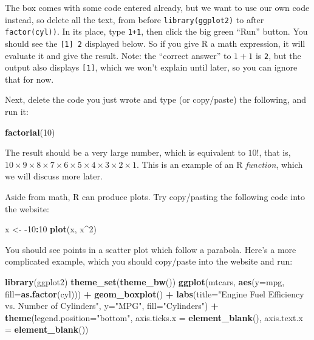 \documentclass[
]{article}
\newenvironment{Shaded}{\begin{snugshade}}{\end{snugshade}}
\newcommand{\DataTypeTok}[1]{\textcolor[rgb]{0.13,0.29,0.53}{#1}}
\newcommand{\DecValTok}[1]{\textcolor[rgb]{0.00,0.00,0.81}{#1}}
\newcommand{\KeywordTok}[1]{\textcolor[rgb]{0.13,0.29,0.53}{\textbf{#1}}}
\newcommand{\NormalTok}[1]{#1}
\newcommand{\OperatorTok}[1]{\textcolor[rgb]{0.81,0.36,0.00}{\textbf{#1}}}
\newcommand{\StringTok}[1]{\textcolor[rgb]{0.31,0.60,0.02}{#1}}
\begin{document}
The box comes with some code entered already, but we want to use our own code instead, so delete all the text, from before \texttt{library(ggplot2)} to after \texttt{factor(cyl))}.
In its place, type \texttt{1+1}, then click the big green ``Run'' button.
You should see the \texttt{{[}1{]}\ 2} displayed below.
So if you give R a math expression, it will evaluate it and give the result.
Note: the ``correct answer'' to \(1+1\) is \texttt{2}, but the output also displays \texttt{{[}1{]}}, which we won't explain until later, so you can ignore that for now.

Next, delete the code you just wrote and type (or copy/paste) the following, and run it:

\begin{Shaded}
\begin{Highlighting}[]
\KeywordTok{factorial}\NormalTok{(}\DecValTok{10}\NormalTok{)}
\end{Highlighting}
\end{Shaded}

The result should be a very large number, which is equivalent to \(10!\), that is, \(10\times9\times8\times7\times6\times5\times4\times3\times2\times1\).
This is an example of an R \emph{function}, which we will discuss more later.

Aside from math, R can produce plots. Try copy/pasting the following code into the website:

\begin{Shaded}
\begin{Highlighting}[]
\NormalTok{x <-}\StringTok{ }\DecValTok{-10}\OperatorTok{:}\DecValTok{10}
\KeywordTok{plot}\NormalTok{(x, x}\OperatorTok{^}\DecValTok{2}\NormalTok{)}
\end{Highlighting}
\end{Shaded}

You should see points in a scatter plot which follow a parabola.
Here's a more complicated example, which you should copy/paste into the website and run:

\begin{Shaded}
\begin{Highlighting}[]
\KeywordTok{library}\NormalTok{(ggplot2)}
\KeywordTok{theme_set}\NormalTok{(}\KeywordTok{theme_bw}\NormalTok{())}
\KeywordTok{ggplot}\NormalTok{(mtcars, }\KeywordTok{aes}\NormalTok{(}\DataTypeTok{y=}\NormalTok{mpg, }\DataTypeTok{fill=}\KeywordTok{as.factor}\NormalTok{(cyl))) }\OperatorTok{+}\StringTok{ }
\StringTok{  }\KeywordTok{geom_boxplot}\NormalTok{() }\OperatorTok{+}\StringTok{ }
\StringTok{  }\KeywordTok{labs}\NormalTok{(}\DataTypeTok{title=}\StringTok{"Engine Fuel Efficiency vs. Number of Cylinders"}\NormalTok{, }\DataTypeTok{y=}\StringTok{"MPG"}\NormalTok{, }\DataTypeTok{fill=}\StringTok{"Cylinders"}\NormalTok{) }\OperatorTok{+}\StringTok{ }
\StringTok{  }\KeywordTok{theme}\NormalTok{(}\DataTypeTok{legend.position=}\StringTok{"bottom"}\NormalTok{, }
        \DataTypeTok{axis.ticks.x =} \KeywordTok{element_blank}\NormalTok{(),}
        \DataTypeTok{axis.text.x =} \KeywordTok{element_blank}\NormalTok{())}
\end{Highlighting}
\end{Shaded}
\end{document}
